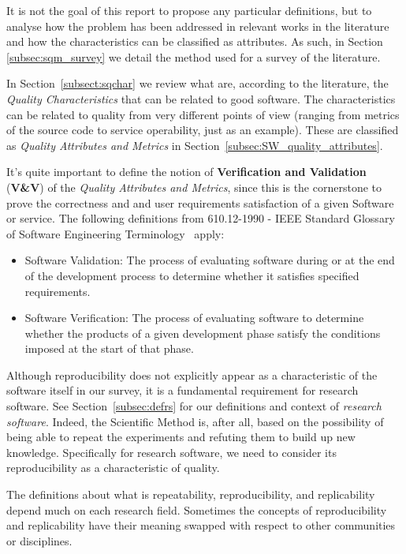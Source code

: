 It is not the goal of this report to propose any particular definitions, but to analyse how the problem has been addressed in relevant works in the literature and how the characteristics can be classified as attributes. As such, in Section \ref{subsec:sqm_survey} we detail the method used for a survey of the literature.

In Section~\ref{subsect:sqchar} we review what are, according to the literature, the \textit{Quality Characteristics} that can be related to good software. The characteristics can be related to quality from very different points of view (ranging from metrics of the source code to service operability, just as an example). These are classified as \textit{Quality Attributes and Metrics} in Section~\ref{subsec:SW_quality_attributes}.

It's quite important to define the notion of \textbf{Verification and Validation} (\textbf{V\&V}) of the \textit{Quality Attributes and Metrics}, since this is the cornerstone to prove the correctness and and user requirements satisfaction of a given Software or service. The following definitions from 610.12-1990 - IEEE Standard Glossary of Software Engineering Terminology~\cite{ieee610} apply:

\begin{itemize}
    \item Software Validation: The process of evaluating software during or at the end of the development process to determine whether it satisfies specified requirements.
    \item Software Verification: The process of evaluating software to determine whether the products of a given development phase satisfy the conditions imposed at the start of that phase.
\end{itemize}

Although reproducibility does not explicitly appear as a characteristic of the software itself in our survey, it is a fundamental requirement for research software. See Section~\ref{subsec:defrs} for our definitions and context of \textit{research software}. Indeed, the Scientific Method is, after all, based on the possibility of being able to repeat the experiments and refuting them to build up new knowledge. Specifically for research software, we need to consider its reproducibility as a characteristic of quality.

The definitions about what is repeatability, reproducibility, and replicability depend much on each research field. Sometimes the concepts of reproducibility and replicability have their meaning swapped with respect to other communities or disciplines.

